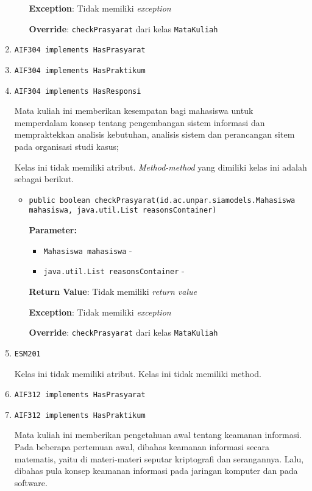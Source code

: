 \documentclass{article}
\begin{document}
\begin{enumerate}
\begin{itemize}
\textbf{Exception}: Tidak memiliki \textit{exception}

\textbf{Override}: \texttt{checkPrasyarat} dari kelas \texttt{MataKuliah}

\end{itemize}
\item \texttt{AIF304 implements HasPrasyarat}

\item \texttt{AIF304 implements HasPraktikum}

\item \texttt{AIF304 implements HasResponsi}

Mata kuliah ini memberikan kesempatan bagi mahasiswa untuk memperdalam konsep
 tentang pengembangan sistem informasi dan mempraktekkan analisis kebutuhan,
 analisis sistem dan perancangan sitem pada organisasi studi kasus;

Kelas ini tidak memiliki atribut. \textit{Method-method} yang dimiliki kelas ini adalah sebagai berikut.
\begin{itemize}
\item \texttt{public boolean checkPrasyarat(id.ac.unpar.siamodels.Mahasiswa mahasiswa, java.util.List reasonsContainer)}

\textbf{Parameter:}
\begin{itemize}
\item \texttt{Mahasiswa mahasiswa} - 
\item \texttt{java.util.List reasonsContainer} - 
\end{itemize}
\textbf{Return Value}: Tidak memiliki \textit{return value}

\textbf{Exception}: Tidak memiliki \textit{exception}

\textbf{Override}: \texttt{checkPrasyarat} dari kelas \texttt{MataKuliah}

\end{itemize}
\item \texttt{ESM201}



Kelas ini tidak memiliki atribut. Kelas ini tidak memiliki method. \item \texttt{AIF312 implements HasPrasyarat}

\item \texttt{AIF312 implements HasPraktikum}

Mata kuliah ini memberikan pengetahuan awal tentang keamanan informasi. Pada
 beberapa pertemuan awal, dibahas keamanan informasi secara matematis, yaitu
 di materi-materi seputar kriptografi dan serangannya. Lalu, dibahas pula
 konsep keamanan informasi pada jaringan komputer dan pada software.


\end{enumerate}
\end{document}
